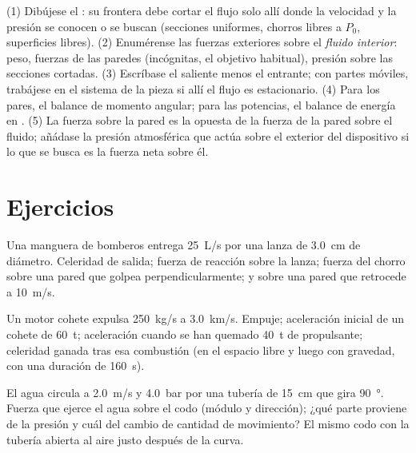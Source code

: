 \begin{method}\label{met:b2:flow-balances:method}
(1) Dibújese el : su frontera debe cortar el flujo solo
allí donde la velocidad y la presión se conocen o se buscan (secciones
uniformes, chorros libres a $P_0$, superficies libres). (2) Enumérense las
fuerzas exteriores sobre el \emph{fluido interior}: peso, fuerzas de las
paredes (incógnitas, el objetivo habitual), presión sobre las secciones
cortadas. (3) Escríbase el  saliente menos
el entrante; con partes móviles, trabájese en el sistema de la pieza si
allí el flujo es estacionario. (4) Para los pares, el balance de momento
angular; para las potencias, el balance de energía en .
(5) La fuerza sobre la pared es la opuesta de la fuerza de la pared sobre
el fluido; añádase la presión atmosférica que actúa sobre el exterior del
dispositivo si lo que se busca es la fuerza neta sobre él.
\end{method}

\section{Ejercicios}

\begin{exercise}[$\star$]\label{exo:b2:flow-balances:1}
Una manguera de bomberos entrega \qty{25}{L/s} por una lanza de
\qty{3.0}{cm} de diámetro. Celeridad de salida; fuerza de reacción sobre la
lanza; fuerza del chorro sobre una pared que golpea perpendicularmente; y sobre una pared que retrocede a \qty{10}{m/s}.
\end{exercise}

\begin{exercise}[$\star$]\label{exo:b2:flow-balances:2}
Un motor cohete expulsa \qty{250}{kg/s} a \qty{3.0}{km/s}. Empuje;
aceleración inicial de un cohete de \qty{60}{t}; aceleración cuando se han
quemado \qty{40}{t} de propulsante; celeridad ganada tras esa combustión
(en el espacio libre y luego con gravedad, con una duración de \qty{160}{s}).
\end{exercise}

\begin{exercise}[$\star$]\label{exo:b2:flow-balances:3}
El agua circula a \qty{2.0}{m/s} y \qty{4.0}{bar} por una tubería de
\qty{15}{cm} que gira \qty{90}{\degree}. Fuerza que ejerce el agua sobre el
codo (módulo y dirección); ¿qué parte proviene de la presión y cuál del
cambio de cantidad de movimiento? El mismo codo con la tubería abierta al
aire justo después de la curva.
\end{exercise}

